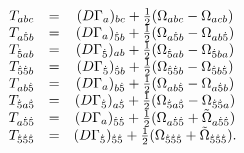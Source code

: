\begin{equation}
\begin{array}{ccc}
  T_{abc}  & = & (D\Gamma_a)_{bc} + {1 \over 2}( \Omega_{abc} - \Omega_{acb})  \\
  T_{a{\dot 5}b} & = & (D\Gamma_a)_{{\dot5}b} + {1 \over 2}(\Omega_{a{\dot 5}b} - \Omega_{ab{\dot 5}}) \\
  T_{{\dot 5}ab} & = & (D\Gamma_{\dot 5})_{ab} + {1 \over 2}(\Omega_{{\dot 5}ab} - \Omega_{{\dot 5}ba}) \\
  T_{{\dot 5}{\dot 5}b} & = & (D\Gamma_{\dot 5})_{{\dot 5}b} +
           {1 \over 2}(\Omega_{{\dot 5}{\dot 5}b} - \Omega_{{\dot 5}b{\dot 5}}) \\
  T_{ab{\dot 5}} & = & (D\Gamma_a)_{b{\dot 5}}+
            {1 \over 2}(\Omega_{ab{\dot 5}} - \Omega_{a{\dot 5}b}) \\
  T_{{\dot 5} a {\dot 5}} & = & (D\Gamma_{{\dot 5}})_{a{\dot 5}}+
            {1 \over 2}(\Omega_{{\dot 5}a{\dot 5}} - \Omega_{{\dot 5}{\dot 5}a}) \\
  T_{a{\dot 5} {\dot 5}} & = & (D\Gamma_a)_{{\dot 5}{\dot 5}}+
            {1 \over 2}(\Omega_{a{\dot 5}{\dot 5}} + \tilde \Omega_{a{\dot 5}{\dot 5}}) \\
  T_{{\dot 5}{\dot 5}{\dot 5}} & = & (D\Gamma_{\dot 5})_{{\dot
  5}{\dot 5}} + {1 \over 2} ( \Omega_{{\dot 5}{\dot 5}{\dot 5}} + \tilde \Omega_{{\dot 5}{\dot 5}{\dot
  5}}).
\end{array}
\end{equation}

